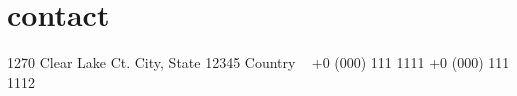 \section{contact}
1270 Clear Lake Ct.
City, State 12345
Country
~
+0 (000) 111 1111
+0 (000) 111 1112
~
